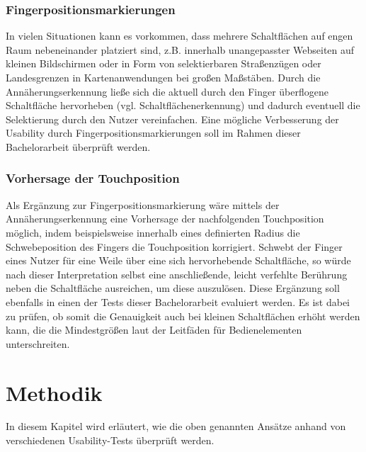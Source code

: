 \documentclass[a4paper,BCOR2mm,12pt,bibliography=totoc,listof=totoc,abstracton]{scrreprt}
\begin{document}
\subsection{Fingerpositionsmarkierungen}
In vielen Situationen kann es vorkommen, dass mehrere Schaltflächen auf engen Raum nebeneinander platziert sind, z.B. innerhalb unangepasster Webseiten auf kleinen Bildschirmen oder in Form von selektierbaren Straßenzügen oder Landesgrenzen in Kartenanwendungen bei großen Maßstäben. Durch die Annäherungserkennung ließe sich die aktuell durch den Finger überflogene Schaltfläche hervorheben (vgl. Schaltflächenerkennung) und dadurch eventuell die Selektierung durch den Nutzer vereinfachen. Eine mögliche Verbesserung der Usability durch Fingerpositionsmarkierungen soll im Rahmen dieser Bachelorarbeit überprüft werden.

\subsection{Vorhersage der Touchposition}
Als Ergänzung zur Fingerpositionsmarkierung wäre mittels der Annäherungserkennung eine Vorhersage der nachfolgenden Touchposition möglich, indem beispielsweise innerhalb eines definierten Radius die Schwebeposition des Fingers die Touchposition korrigiert. Schwebt der Finger eines Nutzer für eine Weile über eine sich hervorhebende Schaltfläche, so würde nach dieser Interpretation selbst eine anschließende, leicht verfehlte Berührung neben die Schaltfläche ausreichen, um diese auszulösen. Diese Ergänzung soll ebenfalls in einen der Tests dieser Bachelorarbeit evaluiert werden. Es ist dabei zu prüfen, ob somit die Genauigkeit auch bei kleinen Schaltflächen erhöht werden kann, die die Mindestgrößen laut der Leitfäden für Bedienelementen unterschreiten.

\chapter{Methodik}
In diesem Kapitel wird erläutert, wie die oben genannten Ansätze anhand von verschiedenen Usability-Tests überprüft werden.
\end{document}
